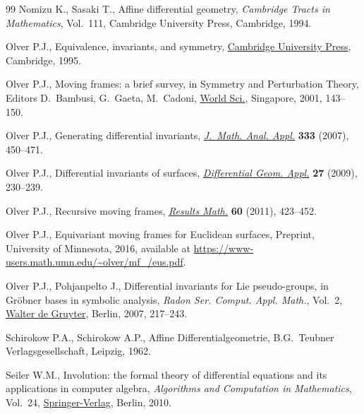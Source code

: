 \documentclass[pdftex]{sigma}%
\numberwithin{equation}{section}
\begin{document}
\begin{thebibliography}{99}
Nomizu K., Sasaki T., Affine differential geometry, \textit{Cambridge Tracts in
 Mathematics}, Vol.~111, Cambridge University Press, Cambridge, 1994.

Olver P.J., Equivalence, invariants, and symmetry, \href{https://doi.org/10.1017/CBO9780511609565}{Cambridge University Press},
 Cambridge, 1995.

Olver P.J., Moving frames: a brief survey, in Symmetry and Perturbation Theory,
 Editors D.~Bambusi, G.~Gaeta, M.~Cadoni, \href{https://doi.org/10.1142/9789812794543_0020}{World Sci.}, Singapore, 2001,
 143--150.

Olver P.J., Generating differential invariants, \href{https://doi.org/10.1016/j.jmaa.2006.12.029}{\textit{J.~Math. Anal. Appl.}}
 \textbf{333} (2007), 450--471.

Olver P.J., Differential invariants of surfaces, \href{https://doi.org/10.1016/j.difgeo.2008.06.020}{\textit{Differential Geom.
 Appl.}} \textbf{27} (2009), 230--239.

Olver P.J., Recursive moving frames, \href{https://doi.org/10.1007/s00025-011-0153-6}{\textit{Results Math.}} \textbf{60} (2011),
 423--452.

Olver P.J., Equivariant moving frames for Euclidean surfaces, {P}reprint,
 University of Minnesota, 2016, available at
 \url{https://www-users.math.umn.edu/~olver/mf_/eus.pdf}.

Olver P.J., Pohjanpelto J., Differential invariants for {L}ie pseudo-groups, in
 Gr\"obner bases in symbolic analysis, \textit{Radon Ser. Comput. Appl.
 Math.}, Vol.~2, \href{https://doi.org/10.1515/9783110922752}{Walter de Gruyter}, Berlin, 2007, 217--243.

Schirokow P.A., Schirokow A.P., Affine {D}ifferentialgeometrie, B.G.~Teubner
 Verlagsgesellschaft, Leipzig, 1962.

Seiler W.M., Involution: the formal theory of differential equations and its
 applications in computer algebra, \textit{Algorithms and Computation in
 Mathematics}, Vol.~24, \href{https://doi.org/10.1007/978-3-642-01287-7}{Springer-Verlag}, Berlin, 2010.

\end{thebibliography}\LastPageEnding
\end{document}
